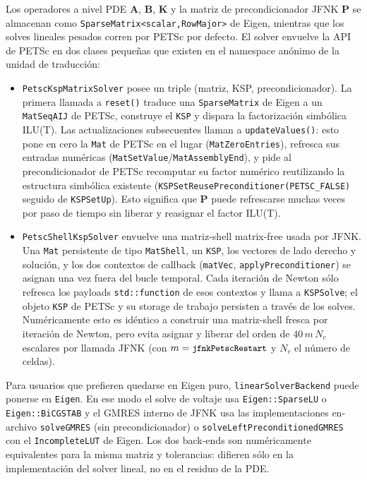 \documentclass[11pt,a4paper]{article}
\newcommand{\code}[1]{\texttt{\small #1}}
\newcommand{\Kstif}{\mathbf{K}}
\newcommand{\Aimp}{\mathbf{A}}
\newcommand{\Bimp}{\mathbf{B}}
\begin{document}
Los operadores a nivel PDE $\Aimp$, $\Bimp$, $\Kstif$ y la matriz de precondicionador JFNK
$\mathbf{P}$ se almacenan como \code{SparseMatrix<scalar,RowMajor>} de Eigen, mientras que
los solves lineales pesados corren por PETSc por defecto. El solver envuelve la API de PETSc
en dos clases pequeñas que existen en el namespace anónimo de la unidad de traducción:
\begin{itemize}
\item \code{PetscKspMatrixSolver} posee un triple (matriz, KSP, precondicionador). La primera
llamada a \code{reset()} traduce una \code{SparseMatrix} de Eigen a un \code{MatSeqAIJ} de
PETSc, construye el \code{KSP} y dispara la factorización simbólica ILU(T). Las
actualizaciones subsecuentes llaman a \code{updateValues()}: esto pone en cero la \code{Mat}
de PETSc en el lugar (\code{MatZeroEntries}), refresca sus entradas numéricas
(\code{MatSetValue}/\code{MatAssemblyEnd}), y pide al precondicionador de PETSc recomputar su
factor numérico reutilizando la estructura simbólica existente
(\code{KSPSetReusePreconditioner(PETSC\_FALSE)} seguido de \code{KSPSetUp}). Esto significa
que $\mathbf{P}$ puede refrescarse muchas veces por paso de tiempo sin liberar y reasignar el
factor ILU(T).
\item \code{PetscShellKspSolver} envuelve una matriz-shell matrix-free usada por JFNK. Una
\code{Mat} persistente de tipo \code{MatShell}, un \code{KSP}, los vectores de lado derecho y
solución, y los dos contextos de callback (\code{matVec}, \code{applyPreconditioner}) se
asignan una vez fuera del bucle temporal. Cada iteración de Newton sólo refresca los payloads
\code{std::function} de esos contextos y llama a \code{KSPSolve}; el objeto \code{KSP} de
PETSc y su storage de trabajo persisten a través de los solves. Numéricamente esto es idéntico
a construir una matriz-shell fresca por iteración de Newton, pero evita asignar y liberar del
orden de $40\,m\,N_c$ escalares por llamada JFNK (con $m=\code{jfnkPetscRestart}$ y $N_c$ el
número de celdas).
\end{itemize}
Para usuarios que prefieren quedarse en Eigen puro, \code{linearSolverBackend} puede ponerse
en \code{Eigen}. En ese modo el solve de voltaje usa \code{Eigen::SparseLU} o
\code{Eigen::BiCGSTAB} y el GMRES interno de JFNK usa las implementaciones en-archivo
\code{solveGMRES} (sin precondicionador) o \code{solveLeftPreconditionedGMRES} con el
\code{IncompleteLUT} de Eigen. Los dos back-ends son numéricamente equivalentes para la misma
matriz y tolerancias: difieren sólo en la implementación del solver lineal, no en el residuo
de la PDE.
\end{document}
